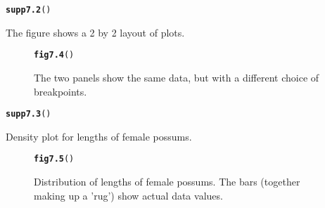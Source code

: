 \documentclass[12pt, a4paper,  BCOR=8.25mm, DIV=15]{scrartcl}\usepackage[]{graphicx}\usepackage[]{color}
\makeatletter
\newcommand{\hlstd}[1]{\textcolor[rgb]{0.345,0.345,0.345}{#1}}%
\newcommand{\hlkwd}[1]{\textcolor[rgb]{0.737,0.353,0.396}{\textbf{#1}}}%
\newenvironment{kframe}{%
 \def\at@end@of@kframe{}%
 \ifinner\ifhmode%
  \def\at@end@of@kframe{\end{minipage}}%
  \begin{minipage}{\columnwidth}%
 \fi\fi%
 \def\FrameCommand##1{\hskip\@totalleftmargin \hskip-\fboxsep
 \colorbox{shadecolor}{##1}\hskip-\fboxsep
     \hskip-\linewidth \hskip-\@totalleftmargin \hskip\columnwidth}%
 \MakeFramed {\advance\hsize-\width
   \@totalleftmargin\z@ \linewidth\hsize
   \@setminipage}}%
 {\par\unskip\endMakeFramed%
 \at@end@of@kframe}
\newenvironment{knitrout}{}{} %
\makeatother
\begin{document}
\begin{suppfigure}[ht]
\begin{knitrout}
\color{fgcolor}\begin{kframe}
\begin{alltt}
\hlkwd{supp7.2}\hlstd{()}
\end{alltt}


{\ttfamily\noindent\bfseries{}}\end{kframe}
\end{knitrout}
\caption{The figure shows a 2 by 2 layout of plots.}
\end{suppfigure}

\begin{figure}[ht]
\begin{knitrout}
\color{fgcolor}\begin{kframe}
\begin{alltt}
\hlkwd{fig7.4}\hlstd{()}
\end{alltt}
\end{kframe}
\end{knitrout}
\caption{The two panels show the same data, but with a different
choice of breakpoints.\label{fig:densitybreaks}}
\end{figure}

\begin{suppfigure}
\begin{knitrout}
\color{fgcolor}\begin{kframe}
\begin{alltt}
\hlkwd{supp7.3}\hlstd{()}
\end{alltt}


{\ttfamily\noindent\bfseries{}}\end{kframe}
\end{knitrout}
\caption{Density plot for lengths of female possums.}
\end{suppfigure}

\clearpage


\begin{figure}[ht]
\begin{knitrout}
\color{fgcolor}\begin{kframe}
\begin{alltt}
\hlkwd{fig7.5}\hlstd{()}
\end{alltt}
\end{kframe}
\end{knitrout}
\vspace*{-18pt}

\caption{Distribution of lengths of female possums.
The bars (together making up a 'rug') show actual data values.\label{fig:boxrugs}}
\end{figure}
\end{document}
